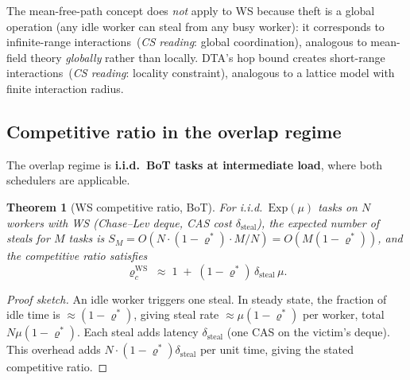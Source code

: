 \documentclass[11pt,a4paper]{report}
\newtheorem{theorem}{Theorem}[section]
\newcommand{\physics}[2]{#1\ \textnormal{(\emph{CS reading}: #2)}}
\begin{document}
The mean-free-path concept does \emph{not} apply to WS because theft
is a global operation (any idle worker can steal from any busy worker):
it corresponds to \physics{infinite-range interactions}{global coordination},
analogous to mean-field theory \emph{globally} rather than locally.
DTA's hop bound creates \physics{short-range interactions}{locality
constraint}, analogous to a lattice model with finite interaction radius.

\subsection{Competitive ratio in the overlap regime}

The overlap regime is \textbf{i.i.d.\ BoT tasks at intermediate load},
where both schedulers are applicable.

\begin{theorem}[WS competitive ratio, BoT]\label{thm:cr_ws_bot}
For i.i.d.\ $\mathrm{Exp}(\mu)$ tasks on $N$ workers with WS
(Chase--Lev deque, CAS cost $\delta_{\mathrm{steal}}$),
the expected number of steals for $M$ tasks is
$S_M = O(N \cdot (1 - \varrho^*) \cdot M / N) = O(M(1-\varrho^*))$,
and the competitive ratio satisfies
\begin{equation}\label{eq:cr_ws}
  \varrho_c^{\mathrm{WS}}
  \;\approx\;
  1 \;+\; (1 - \varrho^*)\,\delta_{\mathrm{steal}}\,\mu.
\end{equation}
\end{theorem}

\begin{proof}[Proof sketch]
An idle worker triggers one steal.  In steady state, the fraction of
idle time is $\approx (1-\varrho^*)$, giving steal rate $\approx \mu(1-\varrho^*)$
per worker, total $N\mu(1-\varrho^*)$.  Each steal adds latency $\delta_{\mathrm{steal}}$
(one CAS on the victim's deque).  This overhead adds
$N \cdot (1-\varrho^*)\delta_{\mathrm{steal}}$ per unit time, giving
the stated competitive ratio.
\end{proof}
\end{document}
